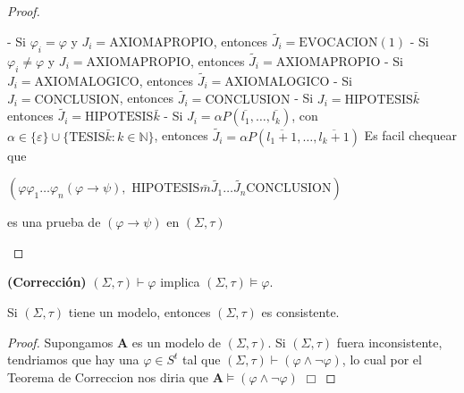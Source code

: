 \begin{proof}
\begin{enumerate}
      - Si $\varphi_{i}=\varphi $ y $J_{i}=\mathrm{AXIOMAPROPIO}$, entonces $\widetilde{J_{i}}=\mathrm{EVOCACION}(1)$
      - Si $\varphi_{i}\neq \varphi $ y $J_{i}=\mathrm{AXIOMAPROPIO}$, entonces $\widetilde{J_{i}}=\mathrm{AXIOMAPROPIO}$
      - Si $J_{i}=\mathrm{AXIOMALOGICO}$, entonces $\widetilde{J_{i}}= \mathrm{AXIOMALOGICO}$
      - Si $J_{i}=\mathrm{CONCLUSION}$, entonces $\widetilde{J_{i}}=\mathrm{ CONCLUSION}$
      - Si $J_{i}=\mathrm{HIPOTESIS}\bar{k}$ entonces $\widetilde{J_{i}}= \mathrm{HIPOTESIS}\bar{k}$
      - Si $J_{i}=\alpha P(\overline{l_{1}}, \dotsc, \overline{l_{k}})$, con $ \alpha \in \{\varepsilon \}\cup \{\mathrm{TESIS}\bar{k}:k\in \mathbb{N}\}$, entonces $\widetilde{J_{i}}=\alpha P(\overline{l_{1}+1}, \dotsc, \overline{l_{k}+1 })$
      Es facil chequear que

      $\displaystyle (\varphi \varphi_{1}\dotsc\varphi_{n}(\varphi \rightarrow \psi ),\text{ HIPOTESIS}\bar{m}\widetilde{J_{1}}\dotsc\widetilde{J_{n}}\text{CONCLUSION}) $

      es una prueba de $(\varphi \rightarrow \psi )$ en $(\Sigma, \tau)$
    \end{enumerate}
  \end{proof}

  \begin{theorem}
    \PN \textbf{(Corrección)} $(\Sigma, \tau) \vdash \varphi$ implica $(\Sigma, \tau) \models \varphi$.
  \end{theorem}

  \begin{corollary}
    \PN Si $(\Sigma, \tau)$ tiene un modelo, entonces $(\Sigma, \tau)$ es consistente.
  \end{corollary}
  \begin{proof}
    Supongamos $\mathbf{A}$ es un modelo de $(\Sigma, \tau).$ Si $(\Sigma, \tau)$ fuera inconsistente, tendriamos que hay una $\varphi \in S^{t}$ tal que $ (\Sigma, \tau)\vdash (\varphi \wedge \lnot \varphi )$, lo cual por el Teorema de Correccion nos diria que $\mathbf{A}\models (\varphi \wedge \lnot \varphi )$ $\Box$
  \end{proof}

